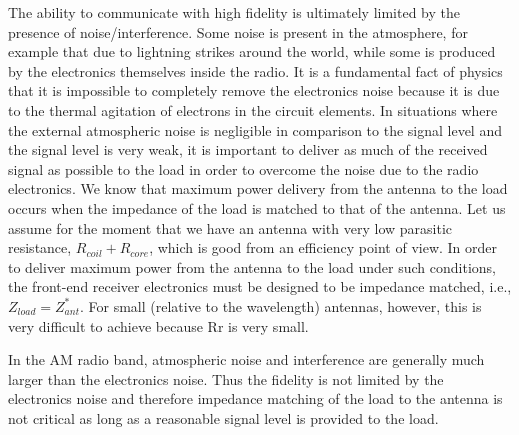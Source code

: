 \documentclass[12pt]{article}
\begin{document}
The ability to communicate with high fidelity is ultimately limited by the presence of noise/interference.
Some noise is present in the atmosphere, for example that due to lightning strikes around the world, while
some is produced by the electronics themselves inside the radio. It is a fundamental fact of physics that it is impossible to completely remove the electronics noise because it is due to the thermal agitation of electrons
in the circuit elements. In situations where the external atmospheric noise is negligible in comparison to
the signal level and the signal level is very weak, it is important to deliver as much of the received signal as
possible to the load in order to overcome the noise due to the radio electronics. We know that maximum
power delivery from the antenna to the load occurs when the impedance of the load is matched to that of
the antenna. Let us assume for the moment that we have an antenna with very low parasitic resistance,
$R_{coil}+R_{core}$, which is good from an efficiency point of view. In order to deliver maximum power from
the antenna to the load under such conditions, the front-end receiver electronics must be designed to be
impedance matched, i.e., $Z_{load}=Z^{*}_{ant}$. For small (relative to the wavelength) antennas, however, this is
very difficult to achieve because Rr is very small.
\par In the AM radio band, atmospheric noise and interference are generally much larger than the electronics
noise. Thus the fidelity is not limited by the electronics noise and therefore impedance matching of the load
to the antenna is not critical as long as a reasonable signal level is provided to the load.
\end{document}
